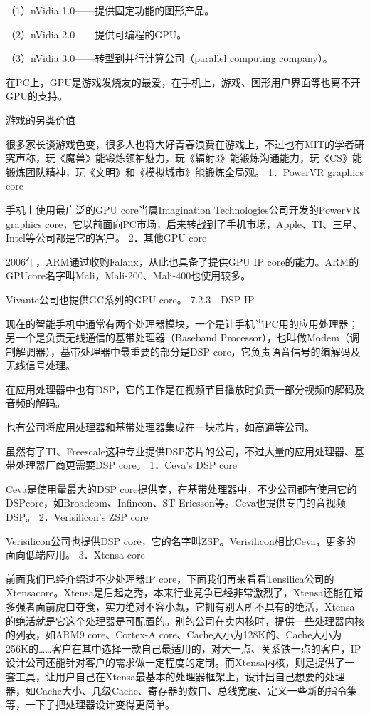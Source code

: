 \documentclass[12pt,UTF8]{ctexbook}
\begin{document}
（1）nVidia 1.0——提供固定功能的图形产品。

（2）nVidia 2.0——提供可编程的GPU。

（3）nVidia 3.0——转型到并行计算公司（parallel computing company）。

在PC上，GPU是游戏发烧友的最爱，在手机上，游戏、图形用户界面等也离不开GPU的支持。

游戏的另类价值

很多家长谈游戏色变，很多人也将大好青春浪费在游戏上，不过也有MIT的学者研究声称，玩《魔兽》能锻炼领袖魅力，玩《辐射3》能锻炼沟通能力，玩《CS》能锻炼团队精神，玩《文明》和《模拟城市》能锻炼全局观。
1．PowerVR graphics core

手机上使用最广泛的GPU core当属Imagination Technologies公司开发的PowerVR graphics core，它以前面向PC市场，后来转战到了手机市场，Apple、TI、三星、Intel等公司都是它的客户。
2．其他GPU core

2006年，ARM通过收购Falanx，从此也具备了提供GPU IP core的能力。ARM的GPUcore名字叫Mali，Mali-200、Mali-400也使用较多。

Vivante公司也提供GC系列的GPU core。
7.2.3　DSP IP

现在的智能手机中通常有两个处理器模块，一个是让手机当PC用的应用处理器；另一个是负责无线通信的基带处理器（Baseband Processor），也叫做Modem（调制解调器），基带处理器中最重要的部分是DSP core，它负责语音信号的编解码及无线信号处理。

在应用处理器中也有DSP，它的工作是在视频节目播放时负责一部分视频的解码及音频的解码。

也有公司将应用处理器和基带处理器集成在一块芯片，如高通等公司。

虽然有了TI、Freescale这种专业提供DSP芯片的公司，不过大量的应用处理器、基带处理器厂商更需要DSP core。
1．Ceva's DSP core

Ceva是使用量最大的DSP core提供商，在基带处理器中，不少公司都有使用它的DSPcore，如Broadcom、Infineon、ST-Ericsson等。Ceva也提供专门的音视频DSP。
2．Verisilicon's ZSP core

Verisilicon公司也提供DSP core，它的名字叫ZSP。Verisilicon相比Ceva，更多的面向低端应用。
3．Xtensa core

前面我们已经介绍过不少处理器IP core，下面我们再来看看Tensilica公司的Xtensacore。Xtensa是后起之秀，本来行业竞争已经非常激烈了，Xtensa还能在诸多强者面前虎口夺食，实力绝对不容小觑，它拥有别人所不具有的绝活，Xtensa的绝活就是它这个处理器是可配置的。别的公司在卖内核时，提供一些处理器内核的列表，如ARM9 core、Cortex-A core、Cache大小为128K的、Cache大小为256K的……客户在其中选择一款自己最适用的，对大一点、关系铁一点的客户，IP设计公司还能针对客户的需求做一定程度的定制。而Xtensa内核，则是提供了一套工具，让用户自己在Xtensa最基本的处理器框架上，设计出自己想要的处理器，如Cache大小、几级Cache、寄存器的数目、总线宽度、定义一些新的指令集等，一下子把处理器设计变得更简单。
\end{document}
